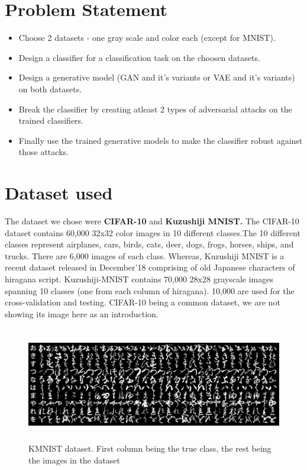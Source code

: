 \documentclass[11pt]{article}
\begin{document}
\section{Problem Statement}

\begin{itemize}
    \item Choose 2 datasets - one gray scale and color each (except for MNIST).
    \item Design a classifier for a classification task on the choosen datasets.
    \item Design a generative model (GAN and it's variants or VAE and it's variants) on both datasets.
    \item Break the classifier by creating atleast 2 types of adversarial attacks on the trained classifiers.
    \item Finally use the trained generative models to make the classifier robust against those attacks.
\end{itemize}

\section{Dataset used}
\begin{flushleft}
The dataset we chose were\textbf{ CIFAR-10 }and \textbf{Kuzushiji MNIST.} 
The CIFAR-10 dataset contains 60,000 32x32 color images in 10 different classes.The 10 different classes represent airplanes, cars, birds, cats, deer, dogs, frogs, horses, ships, and trucks. There are 6,000 images of each class. Whereas, Kuzushiji MNIST is a recent dataset released in December'18 comprising of old Japanese characters of hiragana script. Kuzushiji-MNIST contains 70,000 28x28 grayscale images spanning 10 classes (one from each column of hiragana). 10,000 are used for the cross-validation and testing. CIFAR-10 being a common dataset, we are not showing its image here as an introduction. 
\end{flushleft}
\begin{center}
        \begin{figure}[h]
        \centering
          \includegraphics[width=135mm, height=50mm]{kmnist_pic.png}
          \caption{ KMNIST dataset. First column being the true class, the rest being the images in the dataset \cite{ref3}
          }
          \label{fig:Piston}
        \end{figure}
\end{center}
\end{document}

